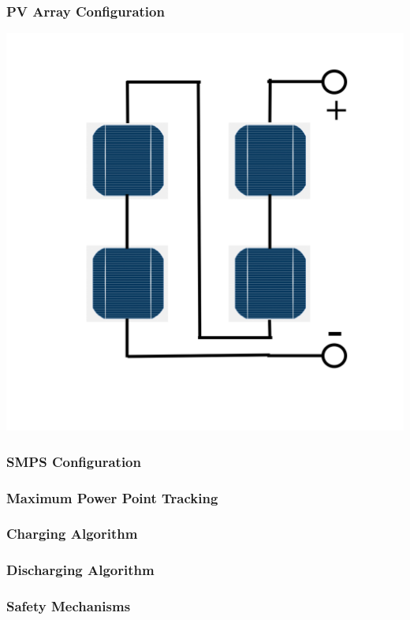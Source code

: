 \documentclass[a4paper]{article}
\begin{document}
\subsubsection{PV Array Configuration}
    \includegraphics[scale=0.3]{Series(S)}

\subsubsection{SMPS Configuration}

\subsubsection{Maximum Power Point Tracking}

\subsubsection{Charging Algorithm}

\subsubsection{Discharging Algorithm}

\subsubsection{Safety Mechanisms}
\end{document}
